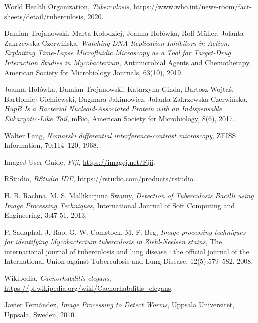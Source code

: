 \documentclass[declaration,shortabstract,mgr]{iithesis}
\begin{document}
\begin{thebibliography}{1}

  World Health Organization,
  \emph{Tuberculosis},
  \url{https://www.who.int/news-room/fact-sheets/detail/tuberculosis},
  2020.

  Damian Trojanowski, Marta Kołodziej, Joanna Hołówka, Rolf M{\"u}ller, Jolanta Zakrzewska-Czerwińska,
  \emph{Watching DNA Replication Inhibitors in Action: Exploiting Time-Lapse Microfluidic Microscopy as a Tool for Target-Drug Interaction Studies in Mycobacterium},
  Antimicrobial Agents and Chemotherapy,
  American Society for Microbiology Journals,
  63(10),
  2019.

  Joanna Hołówka, Damian Trojanowski, Katarzyna Ginda, Bartosz Wojtaś, Bartłomiej Gielniewski, Dagmara Jakimowicz, Jolanta Zakrzewska-Czerwińska,
  \emph{HupB Is a Bacterial Nucleoid-Associated Protein with an Indispensable Eukaryotic-Like Tail},
  mBio,
  American Society for Microbiology,
  8(6),
  2017.

  Walter Lang,
  \emph{Nomarski differential interference-contrast microscopy},
  ZEISS Information,
  70:114–120,
  1968.

  ImageJ User Guide,
  \emph{Fiji},
  \url{https://imagej.net/Fiji}.

  RStudio,
  \emph{RStudio IDE},
  \url{https://rstudio.com/products/rstudio}.

  H. B. Rachna, M. S. Mallikarjuna Swamy,
  \emph{Detection of Tuberculosis Bacilli using Image Processing Techniques},
  International Journal of Soft Computing and Engineering,
  3:47-51,
  2013.

  P. Sadaphal, J. Rao, G. W. Comstock, M. F. Beg,
  \emph{Image processing techniques for identifying Mycobacterium tuberculosis in Ziehl-Neelsen stains},
  The international journal of tuberculosis and lung disease : the official journal of the International Union against Tuberculosis and Lung Disease,
  12(5):579–582,
  2008.

  Wikipedia,
  \emph{Caenorhabditis elegans},
  \url{https://pl.wikipedia.org/wiki/Caenorhabditis_elegans}.

  Javier Fernández,
  \emph{Image Processing to Detect Worms},
  Uppsala Universitet,
  Uppsala,
  Sweden,
  2010.


\end{thebibliography}
\end{document}
